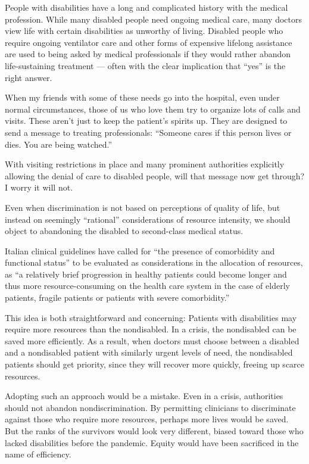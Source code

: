 People with disabilities have a long and complicated history with the
medical profession. While many disabled people need ongoing medical
care, many doctors view life with certain disabilities as unworthy of
living. Disabled people who require ongoing ventilator care and other
forms of expensive lifelong assistance are used to being asked by
medical professionals if they would rather abandon life-sustaining
treatment --- often with the clear implication that ``yes'' is the right
answer.

When my friends with some of these needs go into the hospital, even
under normal circumstances, those of us who love them try to organize
lots of calls and visits. These aren't just to keep the patient's
spirits up. They are designed to send a message to treating
professionals: ``Someone cares if this person lives or dies. You are
being watched.''

With visiting restrictions in place and many prominent authorities
explicitly allowing the denial of care to disabled people, will that
message now get through? I worry it will not.

Even when discrimination is not based on perceptions of quality of life,
but instead on seemingly ``rational'' considerations of resource
intensity, we should object to abandoning the disabled to second-class
medical status.

Italian clinical guidelines have called for ``the presence of
comorbidity and functional status'' to be evaluated as considerations in
the allocation of resources, as ``a relatively brief progression in
healthy patients could become longer and thus more resource-consuming on
the health care system in the case of elderly patients, fragile patients
or patients with severe comorbidity.''

This idea is both straightforward and concerning: Patients with
disabilities may require more resources than the nondisabled. In a
crisis, the nondisabled can be saved more efficiently. As a result, when
doctors must choose between a disabled and a nondisabled patient with
similarly urgent levels of need, the nondisabled patients should get
priority, since they will recover more quickly, freeing up scarce
resources.

Adopting such an approach would be a mistake. Even in a crisis,
authorities should not abandon nondiscrimination. By permitting
clinicians to discriminate against those who require more resources,
perhaps more lives would be saved. But the ranks of the survivors would
look very different, biased toward those who lacked disabilities before
the pandemic. Equity would have been sacrificed in the name of
efficiency.

